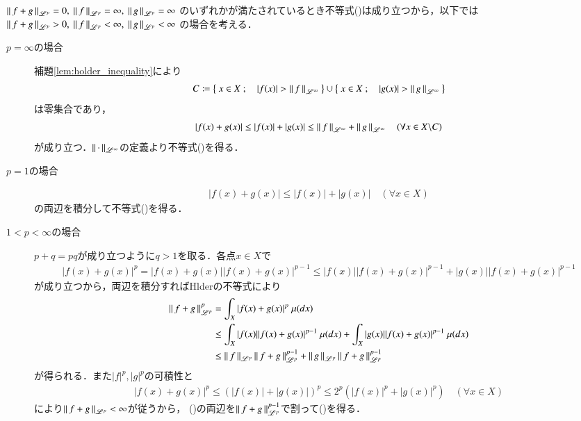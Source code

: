 \begin{prf}
	$\Norm{f+g}{\mathscr{L}^p} = 0,\ \Norm{f}{\mathscr{L}^p} = \infty,\ \Norm{g}{\mathscr{L}^p} = \infty$
	のいずれかが満たされているとき不等式()は成り立つから，以下では
	$\Norm{f+g}{\mathscr{L}^p} > 0,\ \Norm{f}{\mathscr{L}^p} < \infty,\ \Norm{g}{\mathscr{L}^p} < \infty$
	の場合を考える．
	\begin{description}
		\item[$p = \infty$の場合]
			補題\ref{lem:holder_inequality}により
			\begin{align}
				C \coloneqq \left\{\ x \in X\ ;\quad |f(x)| > \left\|\, f\, \right\|_{\mathscr{L}^\infty}\ \right\} \cup \left\{\ x \in X\ ;\quad |g(x)| > \left\|\, g\, \right\|_{\mathscr{L}^\infty}\ \right\}
			\end{align}
			は零集合であり，
			\begin{align}
				|f(x) + g(x)| \leq |f(x)| + |g(x)| \leq \left\|\, f\, \right\|_{\mathscr{L}^\infty} + \left\|\, g\, \right\|_{\mathscr{L}^\infty} \quad (\forall x \in X \backslash C)
			\end{align}
			が成り立つ．$\left\|\, \cdot\, \right\|_{\mathscr{L}^\infty}$の定義より不等式()を得る．
		
		\item[$p = 1$の場合]
			\begin{align}
				|f(x) + g(x)| \leq |f(x)| + |g(x)| \quad (\forall x \in X)
			\end{align}
			の両辺を積分して不等式()を得る．
		
		\item[$1 < p < \infty$の場合]
			$p + q = pq$が成り立つように$q > 1$を取る．各点$x \in X$で
			\begin{align}
				|f(x) + g(x)|^p = |f(x) + g(x)||f(x) + g(x)|^{p-1} \leq |f(x)||f(x) + g(x)|^{p-1} + |g(x)||f(x) + g(x)|^{p-1}
			\end{align}
			が成り立つから，両辺を積分すればHlderの不等式により
			\begin{align}
				\left\|\, f+g\, \right\|_{\mathscr{L}^p}^p &= \int_{X} |f(x) + g(x)|^p\ \mu(dx) \\
				&\leq \int_{X} |f(x)||f(x) + g(x)|^{p-1}\ \mu(dx) + \int_{X} |g(x)||f(x) + g(x)|^{p-1}\ \mu(dx) \\
				&\leq \left\|\, f\, \right\|_{\mathscr{L}^p}\left\|\, f+g\, \right\|_{\mathscr{L}^p}^{p-1} + \left\|\, g\, \right\|_{\mathscr{L}^p}\left\|\, f+g\, \right\|_{\mathscr{L}^p}^{p-1}
				\label{Minkowski_1}
			\end{align}
			が得られる．また$|f|^p,|g|^p$の可積性と
			\begin{align}
				|f(x) + g(x)|^p \leq \left(|f(x)| + |g(x)|\right)^p \leq 2^p \left( |f(x)|^p + |g(x)|^p \right) \quad (\forall x \in X)
			\end{align}
			により$\left\|\, f+g\, \right\|_{\mathscr{L}^p} < \infty$が従うから，
			()の両辺を$\left\|\, f+g\, \right\|_{\mathscr{L}^p}^{p-1}$で割って()を得る．
			\QED
	\end{description}
\end{prf}

